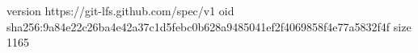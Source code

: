 version https://git-lfs.github.com/spec/v1
oid sha256:9a84e22c26ba4e42a37c1d5febc0b628a9485041ef2f4069858f4e77a5832f4f
size 1165
